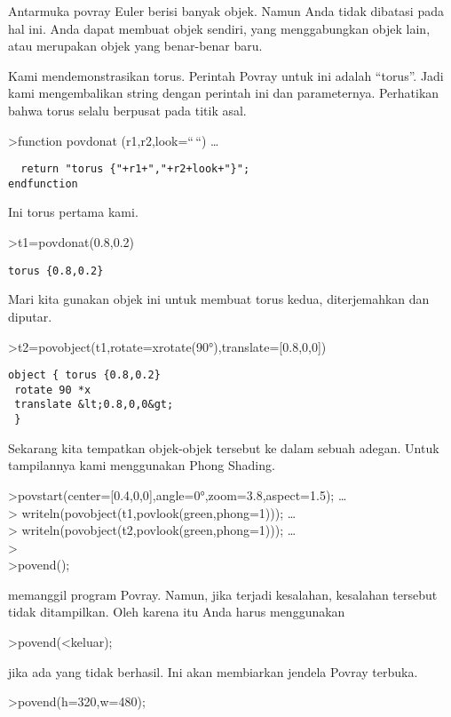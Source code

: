 \documentclass[
]{book}
\begin{document}
Antarmuka povray Euler berisi banyak objek. Namun Anda tidak dibatasi pada hal ini. Anda dapat membuat objek sendiri, yang menggabungkan objek lain, atau merupakan objek yang benar-benar baru.

Kami mendemonstrasikan torus. Perintah Povray untuk ini adalah ``torus''. Jadi kami mengembalikan string dengan perintah ini dan parameternya. Perhatikan bahwa torus selalu berpusat pada titik asal.

\textgreater function povdonat (r1,r2,look=``\,``) \ldots{}

\begin{verbatim}
  return "torus {"+r1+","+r2+look+"}";
endfunction
\end{verbatim}

Ini torus pertama kami.

\textgreater t1=povdonat(0.8,0.2)

\begin{verbatim}
torus {0.8,0.2}
\end{verbatim}

Mari kita gunakan objek ini untuk membuat torus kedua, diterjemahkan dan diputar.

\textgreater t2=povobject(t1,rotate=xrotate(90°),translate={[}0.8,0,0{]})

\begin{verbatim}
object { torus {0.8,0.2}
 rotate 90 *x 
 translate &lt;0.8,0,0&gt;
 }
\end{verbatim}

Sekarang kita tempatkan objek-objek tersebut ke dalam sebuah adegan. Untuk tampilannya kami menggunakan Phong Shading.

\textgreater povstart(center={[}0.4,0,0{]},angle=0°,zoom=3.8,aspect=1.5); \ldots{}\\
\textgreater{} writeln(povobject(t1,povlook(green,phong=1))); \ldots{}\\
\textgreater{} writeln(povobject(t2,povlook(green,phong=1))); \ldots{}\\
\textgreater{}\\
\textgreater povend();

memanggil program Povray. Namun, jika terjadi kesalahan, kesalahan tersebut tidak ditampilkan. Oleh karena itu Anda harus menggunakan

\textgreater povend(\textless keluar);

jika ada yang tidak berhasil. Ini akan membiarkan jendela Povray terbuka.

\textgreater povend(h=320,w=480);
\end{document}
